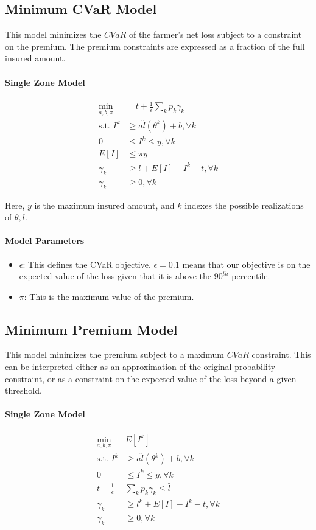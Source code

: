 \documentclass[11pt]{article}
\begin{document}
\subsection*{Minimum CVaR Model}
    This model minimizes the $CVaR$ of the farmer's net loss subject to a constraint on the premium. The premium constraints are expressed as a fraction of the full insured amount. 
    \paragraph*{Single Zone Model}
    \begin{align}
        \min_{a,b,\pi} &\quad t + \frac{1}{\epsilon}\sum_k p_k \gamma_k\\
        \text{s.t.   } I^k &\geq a\hat{l}(\theta^k) + b, \forall k\\
        0 &\leq I^k \leq y, \forall k\\
        E[I] &\leq \bar{\pi}y\\
        \gamma_k &\geq l + E[I] -I^k -t, \forall k\\
        \gamma_k &\geq 0, \forall k
    \end{align}

    Here, $y$ is the maximum insured amount, and $k$ indexes the possible realizations of $\theta, l$. 

    \paragraph*{Model Parameters}
    \begin{itemize}
        \item $\epsilon$: This defines the CVaR objective. $\epsilon = 0.1$ means that our objective is on the expected value of the loss given that it is above the $90^{th}$ percentile. 
        \item $\bar{\pi}$: This is the maximum value of the premium. 
    \end{itemize}

\subsection*{Minimum Premium Model}
    This model minimizes the premium subject to a maximum $CVaR$ constraint. This can be interpreted either as an approximation of the original probability constraint, or as a constraint on the expected value of the loss beyond a given threshold. 
    \paragraph*{Single Zone Model}
    \begin{align}
        \min_{a,b,\pi} & E[I^k]\\
        \text{s.t.   } I^k &\geq a\hat{l}(\theta^k) + b, \forall k\\
        0 &\leq I^k \leq y, \forall k\\
        t + \frac{1}{\epsilon}&\sum_k p_k \gamma_k \leq \bar{l}\\
        \gamma_k &\geq l^k + E[I] -I^k -t, \forall k\\
        \gamma_k &\geq 0, \forall k
    \end{align}
\end{document}
